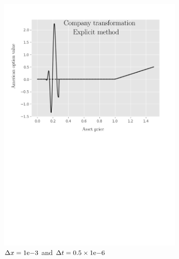 \begin{figure}[tbp]
\begin{subfigure}{0.4\textwidth}
    \includegraphics[width=\textwidth]{chapters/chapter3/TestCase1ExplicitCompany.pdf}
    \caption{$\Delta{x}={1}\mathrm{e}{-3}$ and $\Delta{t}=0.5\times{1}\mathrm{e}{-6}$}
    \label{fig:finitedifferencesschemes:numericaresults:test_case_1_explicit_company}
  \end{subfigure}
  \begin{subfigure}{0.4\textwidth}
    \centering

\end{subfigure}
\end{figure}
